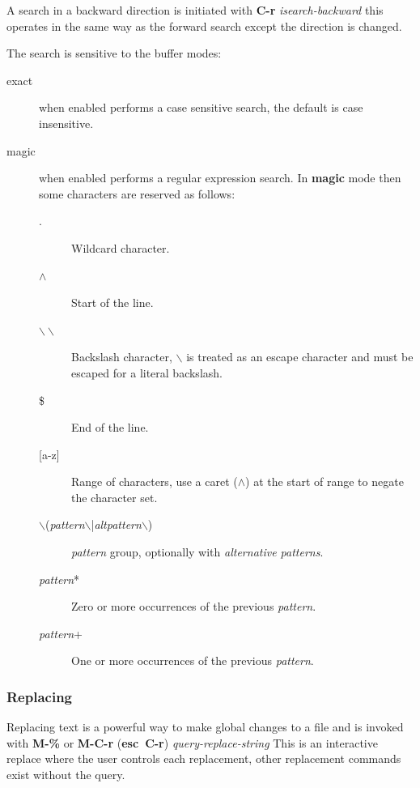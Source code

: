 \documentclass[11pt,a4paper,pdftex]{article}
\begin{document}
  A search in a backward direction is initiated with \textbf{C-r}
  \textit{isearch-backward} this operates in the same way as the forward
  search except the direction is changed.

  The search is sensitive to the buffer modes:

  \begin{description}

    \item[exact] when enabled performs a case sensitive search, the default is
    case insensitive.

    \item[magic] when enabled performs a regular expression search. In
    \textbf{magic} mode then some characters are reserved as follows:

      \begin{description}
        \item[.] Wildcard character.
        \item[$\wedge$] Start of the line.
        \item[$\backslash\backslash$] Backslash character, $\backslash$ is
        treated as an escape character and must be escaped for a literal
        backslash.
        \item[\$] End of the line.
        \item[{[}a-z{]}] Range of characters, use a caret ($\wedge$) at the
        start of range to negate the character set.
        \item[$\backslash$(\textit{pattern}$\backslash$|\textit{altpattern}$\backslash$)]
        \textit{pattern} group, optionally with \textit{alternative patterns}.
        \item[\textit{pattern}*] Zero or more occurrences of the previous \textit{pattern}.
        \item[\textit{pattern}+] One or more occurrences of the previous \textit{pattern}.
      \end{description}

  \end{description}

\subsubsection{Replacing}

  Replacing text is a powerful way to make global changes to a file and is
  invoked with \textbf{M-\%} or \textbf{M-C-r} (\textbf{esc~C-r})
  \textit{query-replace-string} This is an interactive replace where the user
  controls each replacement, other replacement commands exist without the
  query.
\end{document}
